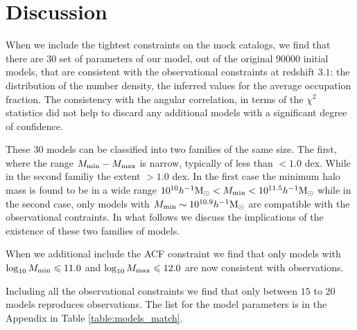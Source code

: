 \documentclass[usenatbib]{mn2e}
\newcommand{\hMsun}{{\ifmmode{h^{-1}{\rm {M_{\odot}}}}\else{$h^{-1}{\rm{M_{\odot}}}$}\fi}}
\begin{document}
\section{Discussion}





When we include the tightest constraints on the mock catalogs, we find
that there are 30 set of parameters of our model, out of the original
90000 initial models, that are consistent with the observational
constraints at redshift $3.1$: the distribution of the number density,
the inferred values for the average occupation fraction. The
consistency with the angular correlation, in terms of the $\chi^2$
statistics did not help to discard any additional models with a
significant degree of confidence. 


These 30 models can be classified into two families of the same
size. The first, where the range $M_{\rm min}-M_{\rm max}$ is narrow,
typically of less than $<1.0$ dex. While in the second familiy the
extent $>1.0$ dex. In the first case the minimum halo mass is found to
be in a wide range $10^{10}\hMsun <M_{\rm min}< 10^{11.5}\hMsun$ while
in the second case, only models with $M_{\rm min}\sim 10^{10.9}\hMsun$
are compatible with the observational contraints. In what follows we
discuss the implications of the existence of these two families of
models.  

When we additional include the ACF constraint we find that only models with 
$\log_{10}M_{\rm min}\leq 11.0$ and $\log_{10}M_{\rm max}\leq 12.0$ 
are now consistent with observations.

Including all the observational constraints we find that only between $15$ to $20$ 
models reproduces observations. The list for the model parameters is in the
Appendix in Table \ref{table:models_match}.
\end{document}
